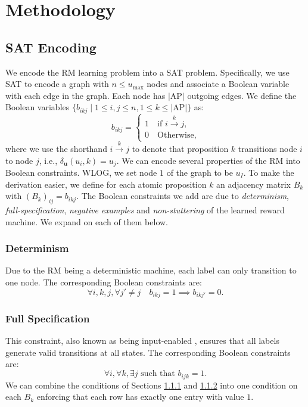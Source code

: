 \documentclass[letterpaper, 10 pt, conference]{ieeeconf}
\begin{document}
\section{Methodology}
\subsection{SAT Encoding}\label{sec:sat_enc}

We encode the RM learning problem into a SAT problem. Specifically, we use SAT to encode a graph with $n \leq u_{\mathrm{max}}$ nodes and associate a Boolean variable with each edge in the graph. Each node has $|\mathrm{AP}|$ outgoing edges. 
We define the Boolean variables $\{b_{ikj} \mid 1 \leq i ,j \leq n, 1 \leq k \leq |\mathrm{AP}|\}$ as:
\begin{equation}
    b_{ikj} = \begin{cases} 1 \quad \text{if } i\overset{k}{\to} j, \\ 0 \quad \text{Otherwise,} \end{cases}
\end{equation}
where we use the shorthand $i\overset{k}{\to} j$ to denote that proposition $k$ transitions node $i$ to node $j$, i.e., $\delta_{\mathbf{u}}(u_i,k)=u_j$. We can encode several properties of the RM into Boolean constraints. WLOG, we set node $1$ of the graph to be $u_I$. To make the derivation easier, we define for each atomic proposition $k$ an adjacency matrix $B_k$ with $(B_k)_{ij} = b_{ikj}$. The Boolean constraints we add are due to \emph{determinism}, \emph{full-specification}, \emph{negative examples} and \emph{non-stuttering} of the learned reward machine. We expand on each of them below.

\subsubsection{Determinism}\label{sec:det}
Due to the RM being a deterministic machine, each label can only transition to one node. The corresponding Boolean constraints are:
\begin{equation}\label{eq:determinism}
    \forall i,k,j, \forall j' \neq j \quad b_{ikj} = 1 \implies b_{ikj'} = 0 .
\end{equation}

\subsubsection{Full Specification}\label{sec:fs}
This constraint, also known as being input-enabled \cite{hungar2003domain}, ensures that all labels generate valid transitions at all states. The corresponding Boolean constraints are: 
\begin{equation}\label{eq:full}
    \forall i, \forall k, \exists j \text{ such that } b_{ijk} = 1.
\end{equation}
We can combine the conditions of Sections \ref{sec:det} and \ref{sec:fs} into one condition on each $B_k$ enforcing that each row has exactly one entry with value $1$.
\end{document}

